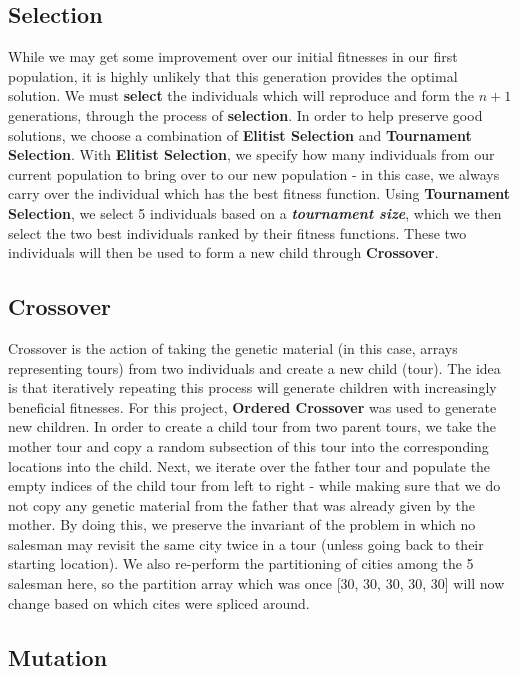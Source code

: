 \documentclass{article}
\begin{document}
\subsection{Selection}

While we may get some improvement over our initial fitnesses in our first population, it is highly unlikely that this generation provides the optimal solution. We must \textbf{select} the individuals which will reproduce and form the $n + 1$ generations, through the process of 
\textbf{selection}. In order to help preserve good solutions, we choose a combination of \textbf{Elitist Selection} and \textbf{Tournament Selection}. With \textbf{Elitist Selection}, we specify how many individuals from our current population to bring over to our new population - in this case, we always carry over the individual which has the best fitness function. Using \textbf{Tournament Selection}, we select 5 individuals based on a \textbf{\emph{tournament size}}, which we then select the two best individuals ranked by their fitness functions. These two individuals will then be used to form a new child through \textbf{Crossover}.

\subsection{Crossover}

Crossover is the action of taking the genetic material (in this case, arrays representing tours) from two individuals and create a new child (tour). The idea is that iteratively repeating this process will generate children with increasingly beneficial fitnesses. For this project, \textbf{Ordered Crossover} was used to generate new children. In order to create a child tour from two parent tours, we take the mother tour and copy a random subsection of this tour into the corresponding locations into the child. Next, we iterate over the father tour and populate the empty indices of the child tour from left to right - while making sure that we do not copy any genetic material from the father that was already given by the mother. By doing this, we preserve the invariant of the problem in which no salesman may revisit the same city twice in a tour (unless going back to their starting location). We also re-perform the partitioning of cities among the 5 salesman here, so the partition array which was once [30, 30, 30, 30, 30] will now change based on which cites were spliced around.

\subsection{Mutation}
\end{document}
